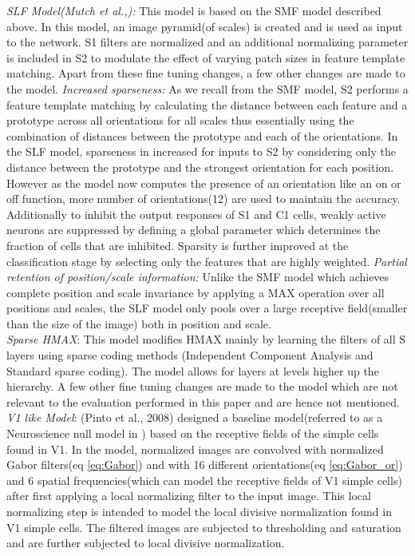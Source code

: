 \documentclass[12pt,twoside]{article}
\theoremstyle{plain}
\theoremstyle{definition}
\theoremstyle{remark}
\begin{document}
\textit{SLF Model(Mutch et al.,):} This model\cite{JimMutch2008} is based on the SMF model described above\cite{ThomasSerre2007}. In this model, an image pyramid(of scales) is created and is used as input to the network. S1 filters are normalized and an additional normalizing parameter is included in S2 to modulate the effect of varying patch sizes in feature template matching. Apart from these fine tuning changes, a few other changes are made to the model. \textit{Increased sparseness:} As we recall from the SMF model, S2 performs a feature template matching by calculating the distance between each feature and a prototype across all orientations for all scales thus essentially using the combination of distances between the prototype and each of the orientations. In the SLF model, sparseness in increased for inputs to S2 by considering only the distance between the prototype and the strongest orientation for each position. However as the model now computes the presence of an orientation like an on or off function, more number of orientations(12) are used to maintain the accuracy. Additionally to inhibit the output responses of S1 and C1 cells, weakly active neurons are suppressed by defining a global parameter which determines the fraction of cells that are inhibited. Sparsity is further improved at the classification stage by selecting only the features that are highly weighted. \textit{Partial retention of position/scale information:} Unlike the SMF model which achieves complete position and scale invariance by applying a MAX operation over all positions and scales, the SLF model only pools over a large receptive field(smaller than the size of the image) both in position and scale.\\

\textit{Sparse HMAX}\cite{XiaolinHu2014}: This model modifies HMAX\cite{MaximilianRiesenhuber1999} mainly by learning the filters of all S layers using sparse coding methods (Independent Component Analysis\cite{AapoHyvaerinen2009} and Standard sparse coding\cite{XiaolinHu2014}). The model allows for layers at levels higher up the hierarchy. A few other fine tuning changes are made to the model which are not relevant to the evaluation performed in this paper and are hence not mentioned.\\

\textit{V1 like Model}\cite{NicolasPinto2008}: (Pinto et al., 2008) designed a baseline model(referred to as a Neuroscience null model in \cite{NicolasPinto2008}) based on the receptive fields of the simple cells found in V1. In the model, normalized images are convolved with normalized Gabor filters(eq \ref{eq:Gabor}) and with 16 different orientations(eq \ref{eq:Gabor_or}) and 6 spatial frequencies(which can model the receptive fields of V1 simple cells\citep{BrunoA.Olshausen1996}) after first applying a local normalizing filter to the input image. This local normalizing step is intended to model the local divisive normalization found in V1 simple cells\cite{Heeger1992}. The filtered images are subjected to thresholding and saturation and are further subjected to local divisive normalization.\\
\end{document}
